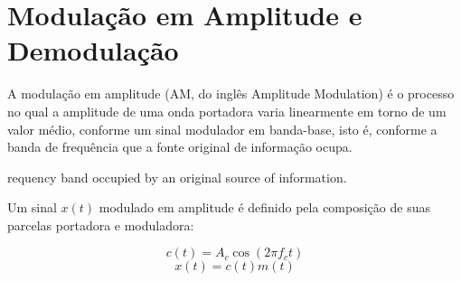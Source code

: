 \section{Modulação em Amplitude e Demodulação}
A modulação em amplitude (AM, do inglês Amplitude Modulation) é o processo no
qual a amplitude de uma onda portadora varia linearmente em torno de um valor
médio, conforme um sinal modulador em banda-base, isto é, conforme a banda de
frequência que a fonte original de informação ocupa.


requency band occupied by an original source of information.

Um sinal $x(t)$ modulado em amplitude é definido pela composição de suas parcelas portadora e moduladora:

\begin{equation}
    c(t) = A_c \cos(2\pi f_c t)
\end{equation}
\begin{equation}
    x(t) = c(t)m(t)
\end{equation}
